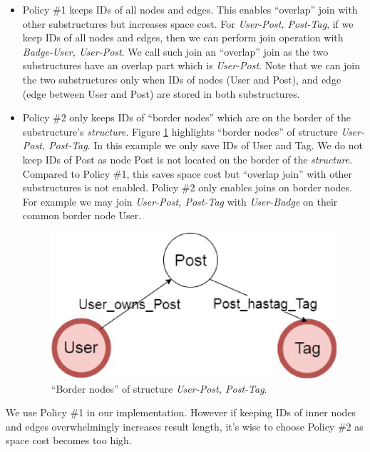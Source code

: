 \begin{itemize}
\item Policy \#1 keeps IDs of all nodes and edges. This enables ``overlap'' join with other substructures but increases space cost. For \textit{User-Post, Post-Tag}, if we keep IDs of all nodes and edges, then we can perform join operation with \textit{Badge-User, User-Post}. We call such join an ``overlap'' join as the two substructures have an overlap part which is \textit{User-Post}. Note that we can join the two substructures only when IDs of nodes (User and Post), and edge (edge between User and Post) are stored in both substructures.

\item Policy \#2 only keeps IDs of ``border nodes'' which are on the border of the substructure's \textit{structure}. Figure \ref{border node} highlights ``border nodes'' of structure \textit{User-Post, Post-Tag}. In this example we only save IDs of User and Tag. We do not keep IDs of Post as node Post is not located on the border of the \textit{structure}. Compared to Policy \#1, this saves space cost but ``overlap join'' with other substructures is not enabled. Policy \#2 only enables joins on border nodes. For example we may join \textit{User-Post, Post-Tag} with \textit{User-Badge} on their common border node User.

\begin{figure}[h]
	\centering
	\includegraphics[scale=0.5]{pic/bordernode.eps}
	\caption{``Border nodes'' of structure \textit{User-Post, Post-Tag}.}
	\label{border node}
\end{figure}
\end{itemize}


We use Policy \#1 in our implementation. However if keeping IDs of inner nodes and edges overwhelmingly increases result length, it's wise to choose Policy \#2 as space cost becomes too high.

